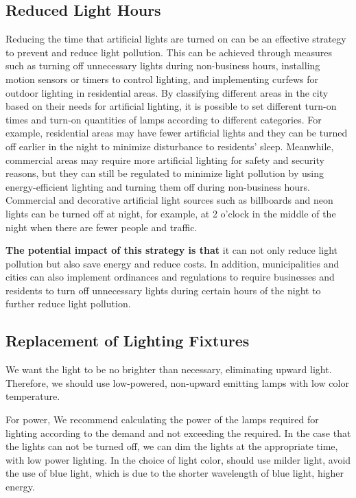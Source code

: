 \documentclass[12pt]{article}
\begin{document}
\subsection{Reduced Light Hours}
Reducing the time that artificial lights are turned on can be an effective strategy to prevent and reduce light pollution. This can be achieved through measures such as turning off unnecessary lights during non-business hours, installing motion sensors or timers to control lighting, and implementing curfews for outdoor lighting in residential areas. By classifying different areas in the city based on their needs for artificial lighting, it is possible to set different turn-on times and turn-on quantities of lamps according to different categories. For example, residential areas may have fewer artificial lights and they can be turned off earlier in the night to minimize disturbance to residents' sleep. Meanwhile, commercial areas may require more artificial lighting for safety and security reasons, but they can still be regulated to minimize light pollution by using energy-efficient lighting and turning them off during non-business hours. Commercial and decorative artificial light sources such as billboards and neon lights can be turned off at night, for example, at 2 o'clock in the middle of the night when there are fewer people and traffic. 

\textbf{The potential impact of this strategy is that} it can not only reduce light pollution but also save energy and reduce costs. In addition, municipalities and cities can also implement ordinances and regulations to require businesses and residents to turn off unnecessary lights during certain hours of the night to further reduce light pollution.

\subsection{Replacement of Lighting Fixtures}
We want the light to be no brighter than necessary, eliminating upward light.
    Therefore, we should use low-powered, non-upward emitting lamps with low color temperature.

    For power, We recommend calculating the power of the lamps required for lighting according to the demand and not exceeding the required. In the case that the lights can not be turned off, we can dim the lights at the appropriate time, with low power lighting. In the choice of light color, should use milder light, avoid the use of blue light, which is due to the shorter wavelength of blue light, higher energy.
\end{document}

